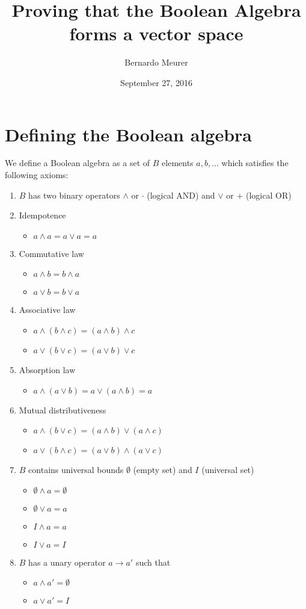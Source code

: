 \documentclass{article}
\title{Proving that the Boolean Algebra forms a vector space}
\date{September 27, 2016}
\author{Bernardo Meurer}
\begin{document}
\maketitle
\newpage
\section{Defining the Boolean algebra}
\label{sec:Defining the Boolean algebra}

We define a Boolean algebra as a set of $B$ elements $a,b,\dots$ which satisfies
the following axioms\cite{booleanalgebra}:

\begin{enumerate}
  \item $B$ has two binary operators $\wedge$ or $\cdot$ (logical AND) and
        $\vee$ or $+$ (logical OR)
  \item Idempotence
  \begin{itemize}
    \item $a\wedge a = a \vee a = a$
  \end{itemize}
  \item Commutative law
  \begin{itemize}
    \item $a \wedge b = b \wedge a$
    \item $a \vee b = b \vee a$
  \end{itemize}
  \item Associative law
  \begin{itemize}
    \item $a \wedge (b \wedge c) = (a \wedge b) \wedge c$
    \item $a \vee (b \vee c) = (a \vee b) \vee c$
  \end{itemize}
  \item Absorption law
  \begin{itemize}
    \item $a \wedge (a \vee b) = a \vee (a \wedge b) = a$
  \end{itemize}
  \item Mutual distributiveness
  \begin{itemize}
    \item $a \wedge (b \vee c) = (a \wedge b) \vee (a \wedge c)$
    \item $a \vee (b \wedge c) = (a \vee b) \wedge (a \vee c)$
  \end{itemize}
  \item $B$ contains universal bounds $\emptyset$ (empty set) and $I$
  (universal set)
  \begin{itemize}
    \item $\emptyset \wedge a = \emptyset$
    \item $\emptyset \vee a = a$
    \item $I \wedge a = a$
    \item $I \vee a = I$
  \end{itemize}
  \item $B$ has a unary operator $a\rightarrow a'$ such that
  \begin{itemize}
    \item $a \wedge a' = \emptyset$
    \item $a \vee a' = I$
  \end{itemize}
\end{enumerate}
\end{document}
